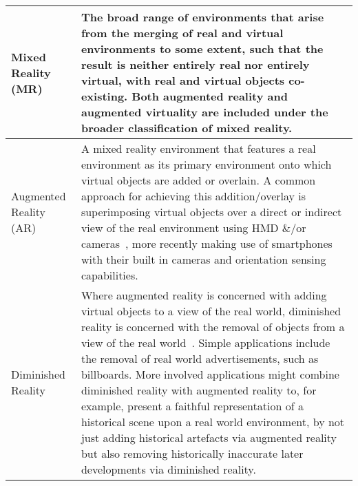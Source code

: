 \begin{center}
\begin{longtable}{ l p{10cm} }
Mixed Reality (MR) & The broad range of environments that arise from the merging of real and virtual environments to some extent, such that the result is neither entirely real nor entirely virtual, with real and virtual objects co-existing. Both augmented reality and augmented virtuality are included under the broader classification of mixed reality. \\

\hline
		

Augmented Reality (AR) & A mixed reality environment that features a real environment as its primary environment onto which virtual objects are added or overlain. A common approach for achieving this addition/overlay is superimposing virtual objects over a direct or indirect view of the real environment using HMD \&/or cameras~\cite{Krevelen2010}, more recently making use of smartphones with their built in cameras and orientation sensing capabilities. \\



\midrule


Diminished Reality & Where augmented reality is concerned with adding virtual objects to a view of the real world, diminished reality is concerned with the removal of objects from a view of the real world~\cite{Mann2002}. Simple applications include the removal of real world advertisements, such as billboards. More involved applications might combine diminished reality with augmented reality to, for example, present a faithful representation of a historical scene upon a real world environment, by not just adding historical artefacts via augmented reality but also removing historically inaccurate later developments via diminished reality. \\

\midrule



\end{longtable}
\end{center}
